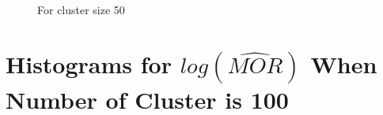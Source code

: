 \documentclass[
  letterpaper,
  DIV=11,
  numbers=noendperiod,
  titlepage]{scrartcl}
\begin{document}
\begin{figure}
\begin{minipage}[t]{0.50\linewidth}
{{}

\caption{For cluster size 50}

}

\end{minipage}%

\end{figure}

\newpage

\hypertarget{histograms-for-logwidehatmor-when-number-of-cluster-is-100}{%
\section{\texorpdfstring{Histograms for \(log(\widehat{MOR})\) When
Number of Cluster is
100}{Histograms for log(\textbackslash widehat\{MOR\}) When Number of Cluster is 100}}\label{histograms-for-logwidehatmor-when-number-of-cluster-is-100}}

\vspace{5mm}
\end{document}

